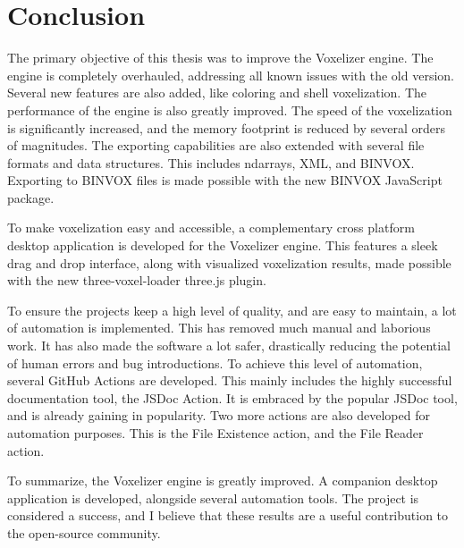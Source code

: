 \chapter{Conclusion}
The primary objective of this thesis was to improve the Voxelizer engine. The engine is completely overhauled, addressing all known issues with the old version. Several new features are also added, like coloring and shell voxelization. The performance of the engine is also greatly improved. The speed of the voxelization is significantly increased, and the memory footprint is reduced by several orders of magnitudes. The exporting capabilities are also extended with several file formats and data structures. This includes ndarrays, XML, and BINVOX. Exporting to BINVOX files is made possible with the new BINVOX JavaScript package.

To make voxelization easy and accessible, a complementary cross platform desktop application is developed for the Voxelizer engine. This features a sleek drag and drop interface, along with visualized voxelization results, made possible with the new three-voxel-loader three.js plugin.

To ensure the projects keep a high level of quality, and are easy to maintain, a lot of automation is implemented. This has removed much manual and laborious work. It has also made the software a lot safer, drastically reducing the potential of human errors and bug introductions. To achieve this level of automation, several GitHub Actions are developed. This mainly includes the highly successful documentation tool, the JSDoc Action. It is embraced by the popular JSDoc tool, and is already gaining in popularity. Two more actions are also developed for automation purposes. This is the File Existence action, and the File Reader action.   

To summarize, the Voxelizer engine is greatly improved. A companion desktop application is developed, alongside several automation tools. The project is considered a success, and I believe that these results are a useful contribution to the open-source community.